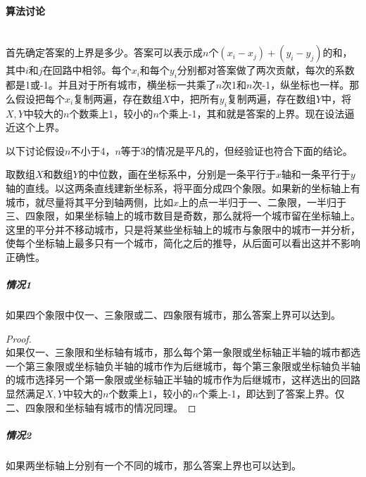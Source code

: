 \documentclass[UTF8]{ctexart}
\newcommand{\myparagraph}[1]{\paragraph{#1}\mbox{}\\}
\theoremstyle{nonumberplain}
\newtheorem{proof}{\hspace{1em}证明：}
\begin{document}
		\myparagraph{算法讨论}
		
			首先确定答案的上界是多少。答案可以表示成$n$个$(x_i-x_j)+(y_i-y_j)$的和，其中$i$和$j$在回路中相邻。每个$x_i$和每个$y_i$分别都对答案做了两次贡献，每次的系数都是1或-1。并且对于所有城市，横坐标一共乘了$n$次1和$n$次-1，纵坐标也一样。那么假设把每个$x_i$复制两遍，存在数组$X$中，把所有$y_i$复制两遍，存在数组$Y$中，将$X,Y$中较大的$n$个数乘上1，较小的$n$个乘上-1，其和就是答案的上界。现在设法逼近这个上界。
			
			以下讨论假设$n$不小于4，$n$等于3的情况是平凡的，但经验证也符合下面的结论。
			
			取数组$X$和数组$Y$的中位数，画在坐标系中，分别是一条平行于$x$轴和一条平行于$y$轴的直线。以这两条直线建新坐标系，将平面分成四个象限。如果新的坐标轴上有城市，就尽量将其平分到轴两侧，比如$x$上的点一半归于一、二象限，一半归于三、四象限，如果坐标轴上的城市数目是奇数，那么就将一个城市留在坐标轴上。这里的平分并不移动城市，只是将某些坐标轴上的城市与象限中的城市一并分析，使每个坐标轴上最多只有一个城市，简化之后的推导，从后面可以看出这并不影响正确性。
			
			\subparagraph{情况1}
			如果四个象限中仅一、三象限或二、四象限有城市，那么答案上界可以达到。
			
			\begin{proof}\mbox{}\\
			
				如果仅一、三象限和坐标轴有城市，那么每个第一象限或坐标轴正半轴的城市都选一个第三象限或坐标轴负半轴的城市作为后继城市，每个第三象限或坐标轴负半轴的城市选择另一个第一象限或坐标轴正半轴的城市作为后继城市，这样选出的回路显然满足$X,Y$中较大的$n$个数乘上1，较小的$n$个乘上-1，即达到了答案上界。仅二、四象限和坐标轴有城市的情况同理。
			\end{proof}
			
			\subparagraph{情况2}
			如果两坐标轴上分别有一个不同的城市，那么答案上界也可以达到。
			
\end{document}
